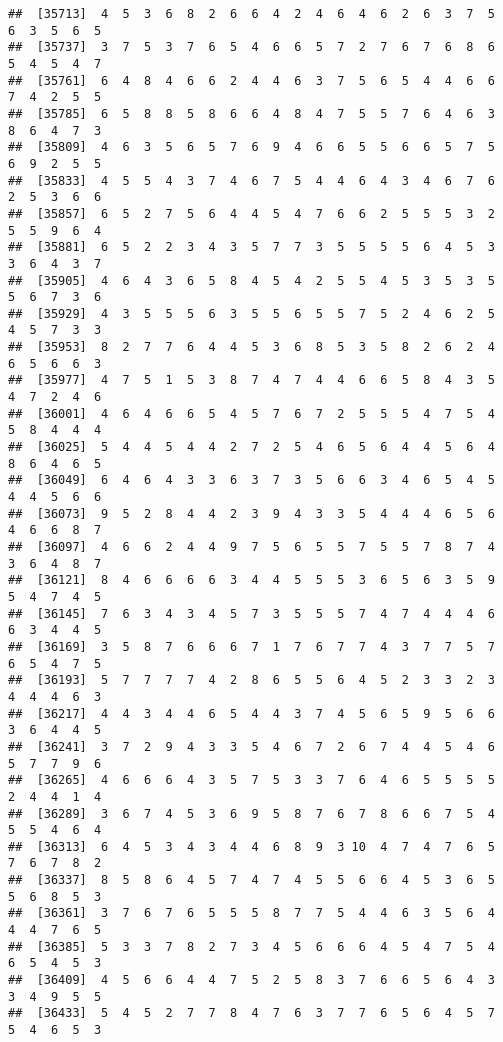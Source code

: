 \documentclass[
]{book}
\begin{document}
\begin{verbatim}
##  [35713]  4  5  3  6  8  2  6  6  4  2  4  6  4  6  2  6  3  7  5  6  3  5  6  5
##  [35737]  3  7  5  3  7  6  5  4  6  6  5  7  2  7  6  7  6  8  6  5  4  5  4  7
##  [35761]  6  4  8  4  6  6  2  4  4  6  3  7  5  6  5  4  4  6  6  7  4  2  5  5
##  [35785]  6  5  8  8  5  8  6  6  4  8  4  7  5  5  7  6  4  6  3  8  6  4  7  3
##  [35809]  4  6  3  5  6  5  7  6  9  4  6  6  5  5  6  6  5  7  5  6  9  2  5  5
##  [35833]  4  5  5  4  3  7  4  6  7  5  4  4  6  4  3  4  6  7  6  2  5  3  6  6
##  [35857]  6  5  2  7  5  6  4  4  5  4  7  6  6  2  5  5  5  3  2  5  5  9  6  4
##  [35881]  6  5  2  2  3  4  3  5  7  7  3  5  5  5  5  6  4  5  3  3  6  4  3  7
##  [35905]  4  6  4  3  6  5  8  4  5  4  2  5  5  4  5  3  5  3  5  5  6  7  3  6
##  [35929]  4  3  5  5  5  6  3  5  5  6  5  5  7  5  2  4  6  2  5  4  5  7  3  3
##  [35953]  8  2  7  7  6  4  4  5  3  6  8  5  3  5  8  2  6  2  4  6  5  6  6  3
##  [35977]  4  7  5  1  5  3  8  7  4  7  4  4  6  6  5  8  4  3  5  4  7  2  4  6
##  [36001]  4  6  4  6  6  5  4  5  7  6  7  2  5  5  5  4  7  5  4  5  8  4  4  4
##  [36025]  5  4  4  5  4  4  2  7  2  5  4  6  5  6  4  4  5  6  4  8  6  4  6  5
##  [36049]  6  4  6  4  3  3  6  3  7  3  5  6  6  3  4  6  5  4  5  4  4  5  6  6
##  [36073]  9  5  2  8  4  4  2  3  9  4  3  3  5  4  4  4  6  5  6  4  6  6  8  7
##  [36097]  4  6  6  2  4  4  9  7  5  6  5  5  7  5  5  7  8  7  4  3  6  4  8  7
##  [36121]  8  4  6  6  6  6  3  4  4  5  5  5  3  6  5  6  3  5  9  5  4  7  4  5
##  [36145]  7  6  3  4  3  4  5  7  3  5  5  5  7  4  7  4  4  4  6  6  3  4  4  5
##  [36169]  3  5  8  7  6  6  6  7  1  7  6  7  7  4  3  7  7  5  7  6  5  4  7  5
##  [36193]  5  7  7  7  7  4  2  8  6  5  5  6  4  5  2  3  3  2  3  4  4  4  6  3
##  [36217]  4  4  3  4  4  6  5  4  4  3  7  4  5  6  5  9  5  6  6  3  6  4  4  5
##  [36241]  3  7  2  9  4  3  3  5  4  6  7  2  6  7  4  4  5  4  6  5  7  7  9  6
##  [36265]  4  6  6  6  4  3  5  7  5  3  3  7  6  4  6  5  5  5  5  2  4  4  1  4
##  [36289]  3  6  7  4  5  3  6  9  5  8  7  6  7  8  6  6  7  5  4  5  5  4  6  4
##  [36313]  6  4  5  3  4  3  4  4  6  8  9  3 10  4  7  4  7  6  5  7  6  7  8  2
##  [36337]  8  5  8  6  4  5  7  4  7  4  5  5  6  6  4  5  3  6  5  5  6  8  5  3
##  [36361]  3  7  6  7  6  5  5  5  8  7  7  5  4  4  6  3  5  6  4  4  4  7  6  5
##  [36385]  5  3  3  7  8  2  7  3  4  5  6  6  6  4  5  4  7  5  4  6  5  4  5  3
##  [36409]  4  5  6  6  4  4  7  5  2  5  8  3  7  6  6  5  6  4  3  3  4  9  5  5
##  [36433]  5  4  5  2  7  7  8  4  7  6  3  7  7  6  5  6  4  5  7  5  4  6  5  3

\end{verbatim}
\end{document}
